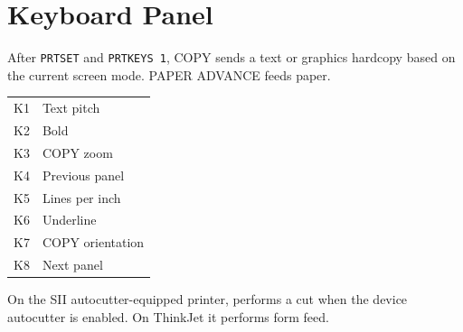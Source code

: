 \documentclass[10pt]{article}
\begin{document}
\section{Keyboard Panel}
After \texttt{PRTSET} and \texttt{PRTKEYS 1}, COPY sends a text or graphics hardcopy based on the current screen mode. PAPER ADVANCE feeds paper.
\begin{tabular}{ll}
K1&Text pitch\\K2&Bold\\K3&COPY zoom\\K4&Previous panel\\
K5&Lines per inch\\K6&Underline\\K7&COPY orientation\\K8&Next panel
\end{tabular}
\par\smallskip
On the SII autocutter-equipped printer, \allowbreak{} performs a cut when the device autocutter is enabled. On ThinkJet it performs form feed.
\end{document}
